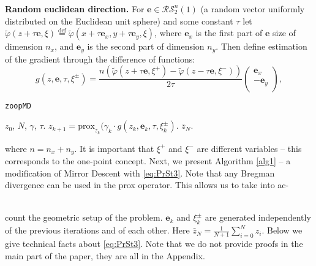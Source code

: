 \documentclass[runningheads]{llncs}
\def\eqdef{\overset{\text{def}}{=}}
\begin{document}
\textbf{Random euclidean direction.} For $\mathbf{e} \in \mathcal{RS}^n_2(1)$ (a random vector uniformly distributed on the Euclidean unit sphere) and some constant $\tau$ let $\tilde \varphi(z + \tau \mathbf{e}, \xi) \eqdef \tilde \varphi(x + \tau \mathbf{e}_x, y+ \tau \mathbf{e}_y, \xi)$, where $\mathbf{e}_x$ is the first part of $\mathbf{e}$ size of dimension $n_x$, and $\mathbf{e}_y$ is the second part of dimension $n_y$. Then define estimation of the gradient through the difference of functions:
\begin{equation}
    \label{eq:PrSt3}
    g(z, \mathbf{e}, \tau,  \xi^{\pm}) = \frac{n \left(\tilde \varphi(z + \tau \mathbf{e},  \xi^+) -  \tilde \varphi(z - \tau \mathbf{e},  \xi^-)\right)}{2\tau}\left(
    \begin{array}{c}
    \mathbf{e}_x\\
    -\mathbf{e}_y \\
    \end{array}
    \right), 
\end{equation}
\begin{minipage}{0.53\linewidth}
     \begin{algorithm}[H]
	\caption{{\tt zoopMD}}
	\label{alg1}
\begin{algorithmic}
\State 
{} $z_0$, $N$, $\gamma$, $\tau$.
    \State $z_{k+1} = \text{prox}_{z_k}(\gamma_k\cdot g(z_k, \mathbf{e}_k, \tau,  \xi^{\pm}_k)$.
\EndFor
\State 
{} $\bar z_{N}$.
\end{algorithmic}
\end{algorithm}
\end{minipage}
\begin{minipage}{0.05\textwidth}
\end{minipage}
\begin{minipage}{0.46\textwidth}
where $n = n_x +n_y$. It is important that $\xi^+$ and $\xi^-$ are different variables -- this corresponds to the one-point concept. 
Next, we present Algorithm \ref{alg1} -- a modification of Mirror Descent with \eqref{eq:PrSt3}. Note that any Bregman divergence can be used in the prox operator. This allows us to take into ac-
\end{minipage}\\
count the geometric setup of the problem. $\mathbf{e}_k$ and $\xi^{\pm}_k$ are generated independently of the previous iterations and of each other. Here $\bar z_{N} = \frac{1}{N+1} \sum_{i=0}^{N} z_{i}$. Below we give technical facts about \eqref{eq:PrSt3}. Note that we do not provide proofs in the main part of the paper, they are all in the Appendix.
\end{document}
